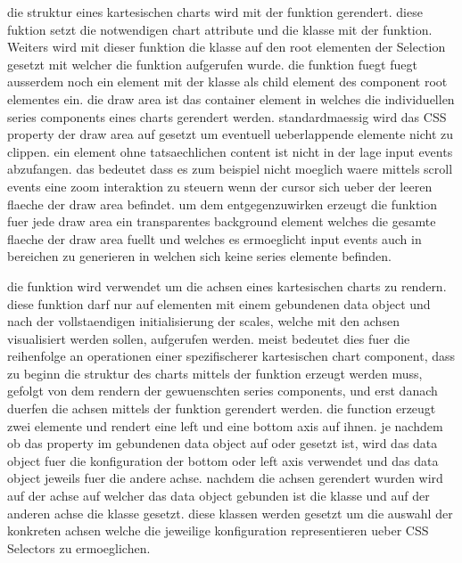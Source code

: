die struktur eines kartesischen charts wird mit der  funktion gerendert.
diese fuktion setzt die notwendigen chart attribute und die  klasse mit der  funktion.
Weiters wird mit dieser funktion die  klasse auf den root elementen der Selection gesetzt mit welcher die funktion aufgerufen wurde.
die  funktion fuegt fuegt ausserdem noch ein  element mit der  klasse als child element des component root elementes ein.
die draw area ist das container element in welches die individuellen series components eines charts gerendert werden.
standardmaessig wird das  CSS property der draw area auf  gesetzt um eventuell ueberlappende elemente nicht zu clippen.
ein  element ohne tatsaechlichen content ist nicht in der lage input events abzufangen.
das bedeutet dass es zum beispiel nicht moeglich waere mittels scroll events eine zoom interaktion zu steuern wenn der cursor sich ueber der leeren flaeche der draw area befindet.
um dem entgegenzuwirken erzeugt die  funktion fuer jede draw area ein transparentes  background element welches die gesamte flaeche der draw area fuellt und welches es ermoeglicht input events auch in bereichen zu generieren in welchen sich keine series elemente befinden.

die  funktion wird verwendet um die achsen eines kartesischen charts zu rendern.
diese funktion darf nur auf elementen mit einem gebundenen  data object und nach der vollstaendigen initialisierung der scales, welche mit den achsen visualisiert werden sollen, aufgerufen werden.
meist bedeutet dies fuer die reihenfolge an operationen einer spezifischerer kartesischen chart component, dass zu beginn die struktur des charts mittels der  funktion erzeugt werden muss, gefolgt von dem rendern der gewuenschten series components, und erst danach duerfen die achsen mittels der  funktion gerendert werden.
die  function erzeugt zwei  elemente und rendert eine left und eine bottom axis auf ihnen.
je nachdem ob das  property im gebundenen data object auf  oder  gesetzt ist, wird das  data object fuer die konfiguration der bottom oder left axis verwendet und das  data object jeweils fuer die andere achse.
nachdem die achsen gerendert wurden wird auf der achse auf welcher das  data object gebunden ist die  klasse und auf der anderen achse die  klasse gesetzt. 
diese klassen werden gesetzt um die auswahl der konkreten achsen welche die jeweilige konfiguration representieren ueber CSS Selectors zu ermoeglichen.

